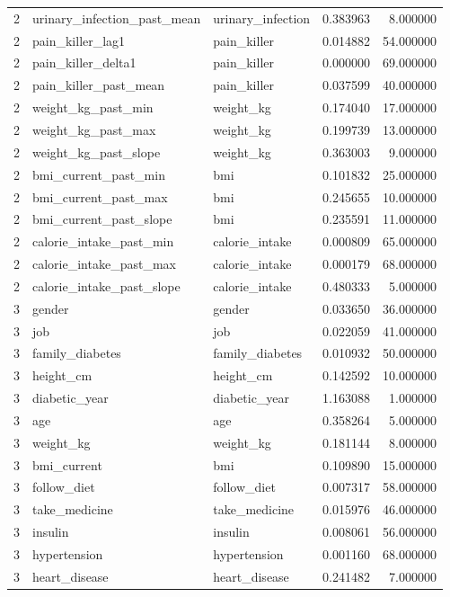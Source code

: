 \begin{longtable}{rllrr}
2 & urinary\_infection\_past\_mean & urinary\_infection & 0.383963 & 8.000000 \\
2 & pain\_killer\_lag1 & pain\_killer & 0.014882 & 54.000000 \\
2 & pain\_killer\_delta1 & pain\_killer & 0.000000 & 69.000000 \\
2 & pain\_killer\_past\_mean & pain\_killer & 0.037599 & 40.000000 \\
2 & weight\_kg\_past\_min & weight\_kg & 0.174040 & 17.000000 \\
2 & weight\_kg\_past\_max & weight\_kg & 0.199739 & 13.000000 \\
2 & weight\_kg\_past\_slope & weight\_kg & 0.363003 & 9.000000 \\
2 & bmi\_current\_past\_min & bmi & 0.101832 & 25.000000 \\
2 & bmi\_current\_past\_max & bmi & 0.245655 & 10.000000 \\
2 & bmi\_current\_past\_slope & bmi & 0.235591 & 11.000000 \\
2 & calorie\_intake\_past\_min & calorie\_intake & 0.000809 & 65.000000 \\
2 & calorie\_intake\_past\_max & calorie\_intake & 0.000179 & 68.000000 \\
2 & calorie\_intake\_past\_slope & calorie\_intake & 0.480333 & 5.000000 \\
3 & gender & gender & 0.033650 & 36.000000 \\
3 & job & job & 0.022059 & 41.000000 \\
3 & family\_diabetes & family\_diabetes & 0.010932 & 50.000000 \\
3 & height\_cm & height\_cm & 0.142592 & 10.000000 \\
3 & diabetic\_year & diabetic\_year & 1.163088 & 1.000000 \\
3 & age & age & 0.358264 & 5.000000 \\
3 & weight\_kg & weight\_kg & 0.181144 & 8.000000 \\
3 & bmi\_current & bmi & 0.109890 & 15.000000 \\
3 & follow\_diet & follow\_diet & 0.007317 & 58.000000 \\
3 & take\_medicine & take\_medicine & 0.015976 & 46.000000 \\
3 & insulin & insulin & 0.008061 & 56.000000 \\
3 & hypertension & hypertension & 0.001160 & 68.000000 \\
3 & heart\_disease & heart\_disease & 0.241482 & 7.000000 \\

\end{longtable}

